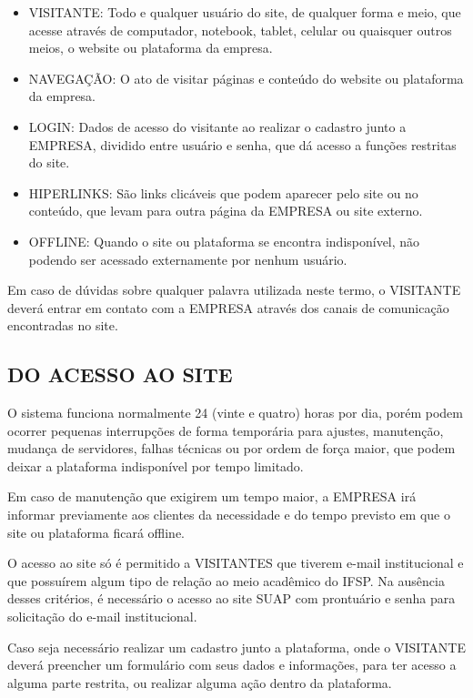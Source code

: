 \begin{itemize}
\item VISITANTE: Todo e qualquer usuário do site, de qualquer forma e meio, que acesse através de computador, notebook, tablet, celular ou quaisquer outros meios, o website ou plataforma da empresa.
\item NAVEGAÇÃO: O ato de visitar páginas e conteúdo do website ou plataforma da empresa.
\item LOGIN: Dados de acesso do visitante ao realizar o cadastro junto a EMPRESA, dividido entre usuário e senha, que dá acesso a funções restritas do site.
\item HIPERLINKS: São links clicáveis que podem aparecer pelo site ou no conteúdo, que levam para outra página da EMPRESA ou site externo.
\item OFFLINE: Quando o site ou plataforma se encontra indisponível, não podendo ser acessado externamente por nenhum usuário.
\end{itemize}
 
Em caso de dúvidas sobre qualquer palavra utilizada neste termo, o VISITANTE deverá entrar em contato com a EMPRESA através dos canais de comunicação encontradas no site.
 
 \subsection{DO ACESSO AO SITE}
 
O sistema funciona normalmente 24 (vinte e quatro) horas por dia, porém podem ocorrer pequenas interrupções de forma temporária para ajustes, manutenção, mudança de servidores, falhas técnicas ou por ordem de força maior, que podem deixar a plataforma indisponível por tempo limitado.

Em caso de manutenção que exigirem um tempo maior, a EMPRESA irá informar previamente aos clientes da necessidade e do tempo previsto em que o site ou plataforma ficará offline.

O acesso ao site só é permitido a VISITANTES que tiverem e-mail institucional e que possuírem algum tipo de relação ao meio acadêmico do IFSP. Na ausência desses critérios, é necessário o acesso ao site SUAP com prontuário e senha para solicitação do e-mail institucional.

Caso seja necessário realizar um cadastro junto a plataforma, onde o VISITANTE deverá preencher um formulário com seus dados e informações, para ter acesso a alguma parte restrita, ou realizar alguma ação dentro da plataforma.

